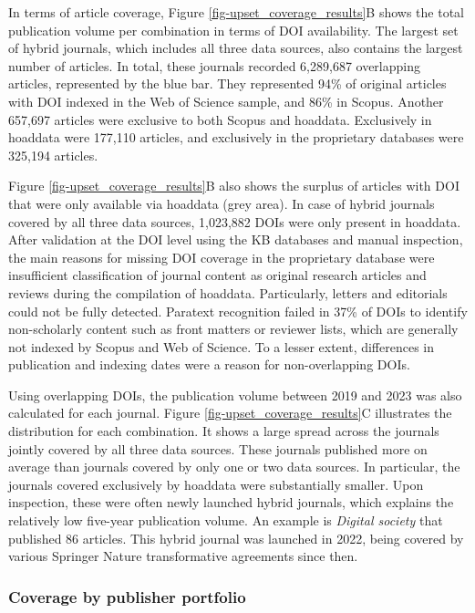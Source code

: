 \documentclass[a4paper,man,floatsintext,longtable,noextraspace,10pt]{apa6}
\begin{document}
In terms of article coverage, Figure \ref{fig-upset_coverage_results}B
shows the total publication volume per combination in terms of DOI
availability. The largest set of hybrid journals, which includes all
three data sources, also contains the largest number of articles. In
total, these journals recorded 6,289,687 overlapping articles,
represented by the blue bar. They represented 94\% of original articles
with DOI indexed in the Web of Science sample, and 86\% in Scopus.
Another 657,697 articles were exclusive to both Scopus and hoaddata.
Exclusively in hoaddata were 177,110 articles, and exclusively in the
proprietary databases were 325,194 articles.

Figure \ref{fig-upset_coverage_results}B also shows the surplus of
articles with DOI that were only available via hoaddata (grey area). In
case of hybrid journals covered by all three data sources, 1,023,882
DOIs were only present in hoaddata. After validation at the DOI level
using the KB databases and manual inspection, the main reasons for
missing DOI coverage in the proprietary database were insufficient
classification of journal content as original research articles and
reviews during the compilation of hoaddata. Particularly, letters and
editorials could not be fully detected. Paratext recognition failed in
37\% of DOIs to identify non-scholarly content such as front matters or
reviewer lists, which are generally not indexed by Scopus and Web of
Science. To a lesser extent, differences in publication and indexing
dates were a reason for non-overlapping DOIs.

Using overlapping DOIs, the publication volume between 2019 and 2023 was
also calculated for each journal. Figure
\ref{fig-upset_coverage_results}C illustrates the distribution for each
combination. It shows a large spread across the journals jointly covered
by all three data sources. These journals published more on average than
journals covered by only one or two data sources. In particular, the
journals covered exclusively by hoaddata were substantially smaller.
Upon inspection, these were often newly launched hybrid journals, which
explains the relatively low five-year publication volume. An example is
\emph{Digital society} that published 86 articles. This hybrid journal
was launched in 2022, being covered by various Springer Nature
transformative agreements since then.

\subsubsection{Coverage by publisher
portfolio}\label{coverage-by-publisher-portfolio}
\end{document}
